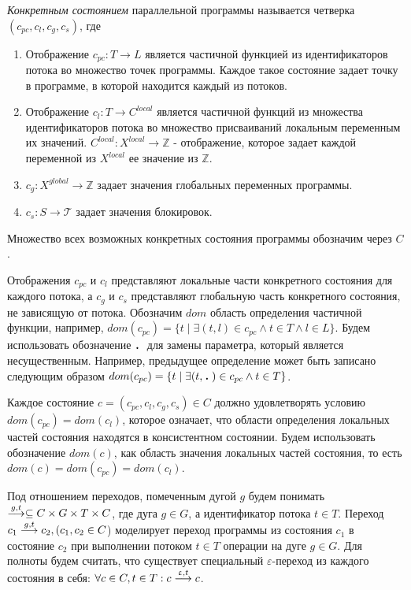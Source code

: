 \emph{Конкретным состоянием} параллельной программы называется четверка $(c_{pc}, c_l, c_g, c_s)$, где
\begin{enumerate}
\item Отображение $c_{pc}: T \to L$ является частичной функцией из идентификаторов потока во множество точек программы.
Каждое такое состояние задает точку в программе, в которой находится каждый из потоков.
\item Отображение $c_l: T \to C^{local}$ является частичной функций из множества идентификаторов потока во множество присваиваний локальным переменным их значений. $C^{local}: X^{local} \to \mathbb{Z}$ - отображение, которое задает каждой переменной из $X^{local}$ ее значение из $\mathbb{Z}$.
\item $c_g: X^{global} \to \mathbb{Z}$ задает значения глобальных переменных программы.
\item $c_s: S \to \mathcal{T}$ задает значения блокировок. 
\end{enumerate}
Множество всех возможных конкретных состояния программы обозначим через $C$.

Отображения $c_{pc}$ и $c_l$ представляют локальные части конкретного состояния для каждого потока, а $c_g$ и $c_s$ представляют глобальную часть конкретного состояния, не зависящую от потока.
Обозначим $dom$ область определения частичной функции, например, $dom(c_{pc})=\{ t \mid \exists (t, l) \in c_{pc} \land t \in T \land l \in L \}$.
Будем использовать обозначение $\qdot$ для замены параметра, который является несущественным.
Например, предыдущее определение может быть записано следующим образом $dom(c_{pc})=\{ t \mid \exists (t, \qdot) \in c_{pc} \land t \in T\}$.

Каждое состояние $c=(c_{pc}, c_l, c_g, c_s)\in C$ должно удовлетворять условию $dom(c_{pc})=dom(c_l)$, которое означает, что области определения локальных частей состояния находятся в консистентном состоянии.
Будем использовать обозначение $dom(c)$, как область значения локальных частей состояния, то есть $dom(c)=dom(c_{pc})=dom(c_l)$.

Под отношением переходов, помеченным дугой $g$ будем понимать $\stackrel{g,t}{\longrightarrow} \subseteq C \times G \times T \times C$, где дуга $g \in G$, а идентификатор потока $t \in T$.
Переход  $c_1 \stackrel{g,t}{\longrightarrow} c_2, (c_1, c_2 \in C$) моделирует переход программы из состояния $c_1$ в состояние $c_2$ при выполнении потоком $t \in T$ операции на дуге $g \in G$.
Для полноты будем считать, что существует специальный $\varepsilon$-переход из каждого состояния в себя:
$\forall c \in C, t \in T: c \stackrel{\upvarepsilon, t}{\longrightarrow} c$.

